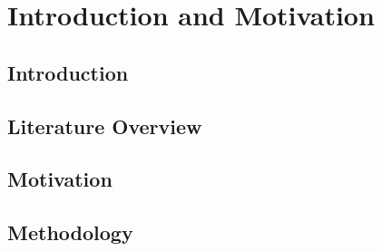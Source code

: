 \chapter{Introduction and Motivation}

\section{Introduction}

\section{Literature Overview}

\section{Motivation}

\section{Methodology}


